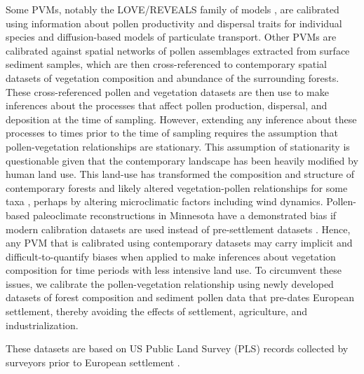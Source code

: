 \documentclass[12pt]{article}
\begin{document}
Some PVMs, notably the LOVE/REVEALS family of models
\citep{sugita2007theory1, sugita2007theory2}, are calibrated using
information about pollen productivity and dispersal traits for
individual species and diffusion-based models of particulate
transport.  Other PVMs are calibrated against spatial networks of
pollen assemblages extracted from surface sediment samples, which are
then cross-referenced to contemporary spatial datasets of vegetation
composition and abundance of the surrounding forests. These
cross-referenced pollen and vegetation datasets are then use to make
inferences about the processes that affect pollen production,
dispersal, and deposition at the time of sampling. However, extending
any inference about these processes to times prior to the time of
sampling requires the assumption that pollen-vegetation relationships
are stationary.  This assumption of stationarity is questionable given
that the contemporary landscape has been heavily modified by human
land use.  This land-use has transformed the composition and structure
of contemporary forests and likely altered vegetation-pollen
relationships for some taxa \citep{kujawa2015}, perhaps by altering
microclimatic factors including wind dynamics.  Pollen-based
paleoclimate reconstructions in Minnesota have a demonstrated bias if
modern calibration datasets are used instead of pre-settlement
datasets \citep{st2014bias}. Hence, any PVM that is calibrated using
contemporary datasets may carry implicit and difficult-to-quantify
biases when applied to make inferences about vegetation composition
for time periods with less intensive land use.  To circumvent these
issues, we calibrate the pollen-vegetation relationship using newly
developed datasets of forest composition and sediment pollen data that
pre-dates European settlement, thereby avoiding the effects of
settlement, agriculture, and industrialization.

These datasets are based on US Public Land Survey (PLS) records
collected by surveyors prior to European settlement
\citep{bourdo1956review, schulte2001original}.
\end{document}
